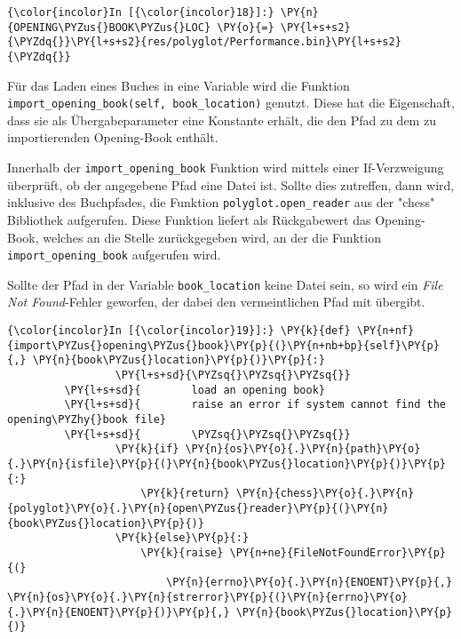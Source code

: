     \begin{Verbatim}[commandchars=\\\{\}]
{\color{incolor}In [{\color{incolor}18}]:} \PY{n}{OPENING\PYZus{}BOOK\PYZus{}LOC} \PY{o}{=} \PY{l+s+s2}{\PYZdq{}}\PY{l+s+s2}{res/polyglot/Performance.bin}\PY{l+s+s2}{\PYZdq{}}
\end{Verbatim}

    Für das Laden eines Buches in eine Variable wird die Funktion
\texttt{import\_opening\_book(self,\ book\_location)} genutzt. Diese hat
die Eigenschaft, dass sie als Übergabeparameter eine Konstante erhält,
die den Pfad zu dem zu importierenden Opening-Book enthält.

Innerhalb der \texttt{import\_opening\_book} Funktion wird mittels einer
If-Verzweigung überprüft, ob der angegebene Pfad eine Datei ist. Sollte
dies zutreffen, dann wird, inklusive des Buchpfades, die Funktion
\texttt{polyglot.open\_reader} aus der "chess" Bibliothek aufgerufen.
Diese Funktion liefert als Rückgabewert das Opening-Book, welches an die
Stelle zurückgegeben wird, an der die Funktion
\texttt{import\_opening\_book} aufgerufen wird.

Sollte der Pfad in der Variable \texttt{book\_location} keine Datei
sein, so wird ein \emph{File Not Found}-Fehler geworfen, der dabei den
vermeintlichen Pfad mit übergibt.

    \begin{Verbatim}[commandchars=\\\{\}]
{\color{incolor}In [{\color{incolor}19}]:} \PY{k}{def} \PY{n+nf}{import\PYZus{}opening\PYZus{}book}\PY{p}{(}\PY{n+nb+bp}{self}\PY{p}{,} \PY{n}{book\PYZus{}location}\PY{p}{)}\PY{p}{:}
                 \PY{l+s+sd}{\PYZsq{}\PYZsq{}\PYZsq{}}
         \PY{l+s+sd}{        load an opening book}
         \PY{l+s+sd}{        raise an error if system cannot find the opening\PYZhy{}book file}
         \PY{l+s+sd}{        \PYZsq{}\PYZsq{}\PYZsq{}}
                 \PY{k}{if} \PY{n}{os}\PY{o}{.}\PY{n}{path}\PY{o}{.}\PY{n}{isfile}\PY{p}{(}\PY{n}{book\PYZus{}location}\PY{p}{)}\PY{p}{:}
                     \PY{k}{return} \PY{n}{chess}\PY{o}{.}\PY{n}{polyglot}\PY{o}{.}\PY{n}{open\PYZus{}reader}\PY{p}{(}\PY{n}{book\PYZus{}location}\PY{p}{)}
                 \PY{k}{else}\PY{p}{:}
                     \PY{k}{raise} \PY{n+ne}{FileNotFoundError}\PY{p}{(}
                         \PY{n}{errno}\PY{o}{.}\PY{n}{ENOENT}\PY{p}{,} \PY{n}{os}\PY{o}{.}\PY{n}{strerror}\PY{p}{(}\PY{n}{errno}\PY{o}{.}\PY{n}{ENOENT}\PY{p}{)}\PY{p}{,} \PY{n}{book\PYZus{}location}\PY{p}{)}
\end{Verbatim}

